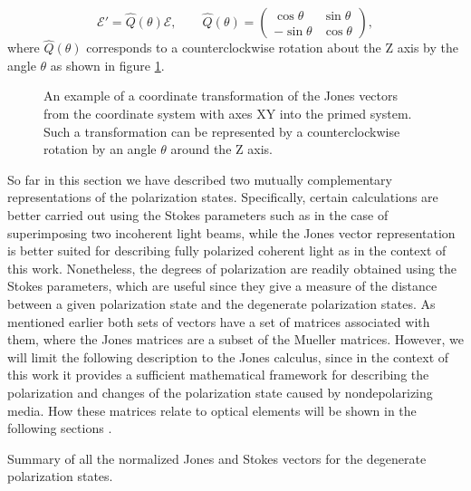 \begin{equation}
    \label{eq:jones_vector_transformation}
    \bm{\mathcal{E}}' = \hat{Q}(\theta) \bm{\mathcal{E}}, \qquad
    \hat{Q}(\theta) =
    \begin{pmatrix}
    \cos \theta & \sin \theta \\
    -\sin \theta & \cos \theta
    \end{pmatrix},
\end{equation}
where $\hat{Q}(\theta)$ corresponds to a counterclockwise rotation about the Z axis by the angle $\theta$ as shown in figure \ref{fig:frame_rotation}. 

\begin{figure}[h]
    \centering
    
    \caption{An example of a coordinate transformation of the Jones vectors from the coordinate system with axes XY into the primed system. Such a transformation can be represented by a counterclockwise rotation by an angle $\theta$ around the Z axis.}
    \label{fig:frame_rotation}
\end{figure}

So far in this section we have described two mutually complementary representations of the polarization states. Specifically, certain calculations are better carried out using the Stokes parameters such as in the case of superimposing two incoherent light beams, while the Jones vector representation is better suited for describing fully polarized coherent light as in the context of this work. Nonetheless, the degrees of polarization are readily obtained using the Stokes parameters, which are useful since they give a measure of the distance between a given polarization state and the degenerate polarization states. As mentioned earlier both sets of vectors have a set of matrices associated with them, where the Jones matrices are a subset of the Mueller matrices. However, we will limit the following description to the Jones calculus, since in the context of this work it provides a sufficient mathematical framework for describing the polarization and changes of the polarization state caused by nondepolarizing media. How these matrices relate to optical elements will be shown in the following sections \cite{Hecht, GilPerez2017}.

\begin{table}[H]
    \centering
    
    \caption{Summary of all the normalized Jones and Stokes vectors for the degenerate polarization states.}
    \label{tab:pol_statevectors}
\end{table}

